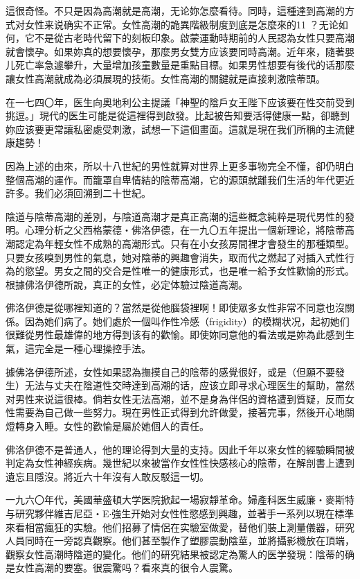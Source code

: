 \documentclass[12pt,UTF8]{ctexbook}
\begin{document}
這很奇怪。不只是因為高潮就是高潮，无论妳怎麼看待。同時，這種達到高潮的方式对女性来说确实不正常。女性高潮的詭異階級制度到底是怎麼來的11 ？无论如何，它不是從古老時代留下的刻板印象。啟蒙運動時期前的人民認為女性只要高潮就會懷孕。如果妳真的想要懷孕，那麼男女雙方应该要同時高潮。近年來，隨著嬰儿死亡率急遽攀升，大量增加孩童數量是重點目標。如果男性想要有後代的话那麼讓女性高潮就成為必須展現的技術。女性高潮的關鍵就是直接刺激陰蒂頭。

在一七四〇年，医生向奧地利公主提議「神聖的陰戶女王陛下应该要在性交前受到挑逗。」現代的医生可能是從這裡得到啟發。比起被告知要活得健康一點，卻聽到妳应该要更常讓私密處受刺激，試想一下這個畫面。這就是現在我们所稱的主流健康趨勢！

因為上述的由來，所以十八世紀的男性就算对世界上更多事物完全不懂，卻仍明白整個高潮的運作。而籠罩自卑情結的陰蒂高潮，它的源頭就離我们生活的年代更近許多。我们必須回溯到二十世紀。

陰道与陰蒂高潮的差別，与陰道高潮才是真正高潮的這些概念純粹是現代男性的發明。心理分析之父西格蒙德‧佛洛伊德，在一九〇五年提出一個新理论，將陰蒂高潮認定為年輕女性不成熟的高潮形式。只有在小女孩房間裡才會發生的那種類型。只要女孩嗅到男性的氣息，她对陰蒂的興趣會消失，取而代之燃起了对插入式性行為的慾望。男女之間的交合是性唯一的健康形式，也是唯一給予女性歡愉的形式。根據佛洛伊德所說，真正的女性，必定体驗过陰道高潮。

佛洛伊德是從哪裡知道的？當然是從他腦袋裡啊！即使眾多女性非常不同意也沒關係。因為她们病了。她们處於一個叫作性冷感（frigidity）的模糊状况，起初她们很難從男性最雄偉的地方得到该有的歡愉。即使妳同意他的看法或是妳為此感到生氣，這完全是一種心理操控手法。

據佛洛伊德所述，女性如果認為撫摸自己的陰蒂的感覺很好，或是（但願不要發生）无法与丈夫在陰道性交時達到高潮的话，应该立即寻求心理医生的幫助，當然对男性来说這很棒。倘若女性无法高潮，並不是身為伴侶的資格遭到質疑，反而女性需要為自己做一些努力。現在男性正式得到允許做愛，接著完事，然後开心地關燈轉身入睡。女性的歡愉是屬於她個人的責任。

佛洛伊德不是普通人，他的理论得到大量的支持。因此千年以來女性的經驗瞬間被判定為女性神經疾病。幾世紀以來被當作女性性快感核心的陰蒂，在解剖書上遭到遺忘且隱沒。將近六十年沒有人敢反駁這一切。

一九六〇年代，美國華盛頓大学医院掀起一場寂靜革命。婦產科医生威廉‧麥斯特与研究夥伴維吉尼亞‧E‧強生开始对女性性慾感到興趣，並著手一系列以現在標準來看相當瘋狂的实驗。他们招募了情侶在实驗室做愛，替他们裝上測量儀器，研究人員同時在一旁認真觀察。他们甚至製作了塑膠震動陰莖，並將攝影機放在頂端，觀察女性高潮時陰道的變化。他们的研究結果被認定為驚人的医学發現：陰蒂的确是女性高潮的要塞。很震驚吗？看來真的很令人震驚。
\end{document}
